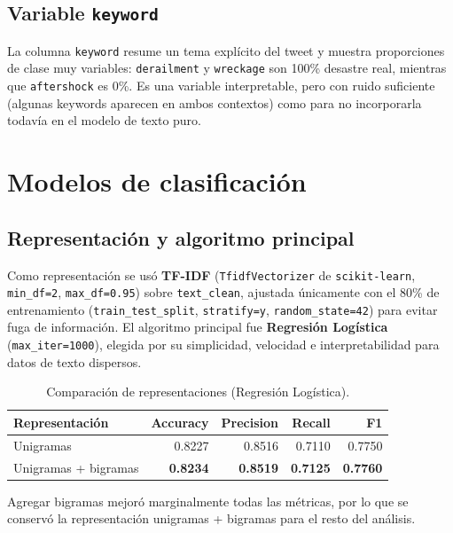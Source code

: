 \documentclass[11pt]{article}
\begin{document}
\subsection{Variable \texttt{keyword}}

La columna \texttt{keyword} resume un tema expl\'icito del tweet y muestra proporciones
de clase muy variables: \texttt{derailment} y \texttt{wreckage} son 100\% desastre real,
mientras que \texttt{aftershock} es 0\%. Es una variable interpretable, pero con ruido
suficiente (algunas keywords aparecen en ambos contextos) como para no incorporarla
todav\'ia en el modelo de texto puro.

\section{Modelos de clasificaci\'on}

\subsection{Representaci\'on y algoritmo principal}

Como representaci\'on se us\'o \textbf{TF-IDF} (\texttt{TfidfVectorizer} de
\texttt{scikit-learn}, \texttt{min\_df=2}, \texttt{max\_df=0.95}) sobre
\texttt{text\_clean}, ajustada \'unicamente con el 80\% de entrenamiento
(\texttt{train\_test\_split}, \texttt{stratify=y}, \texttt{random\_state=42}) para
evitar fuga de informaci\'on. El algoritmo principal fue \textbf{Regresi\'on
Log\'istica} (\texttt{max\_iter=1000}), elegida por su simplicidad, velocidad e
interpretabilidad para datos de texto dispersos.

\begin{table}[H]
\centering
\caption{Comparaci\'on de representaciones (Regresi\'on Log\'istica).}
\begin{tabular}{lrrrr}
\toprule
Representaci\'on & Accuracy & Precision & Recall & F1 \\
\midrule
Unigramas & 0.8227 & 0.8516 & 0.7110 & 0.7750 \\
Unigramas + bigramas & \textbf{0.8234} & \textbf{0.8519} & \textbf{0.7125} & \textbf{0.7760} \\
\bottomrule
\end{tabular}
\end{table}

Agregar bigramas mejor\'o marginalmente todas las m\'etricas, por lo que se conserv\'o
la representaci\'on unigramas + bigramas para el resto del an\'alisis.
\end{document}
